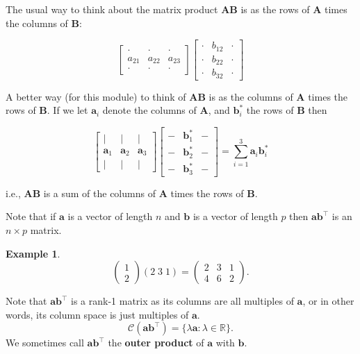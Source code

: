 \documentclass[]{book}
\theoremstyle{definition}
\theoremstyle{definition}
\newtheorem{example}{Example}[chapter]
\theoremstyle{definition}
\theoremstyle{remark}
\begin{document}
The usual way to think about the matrix product \(\boldsymbol A\boldsymbol B\) is as the rows of \(\boldsymbol A\) times the columns of \(\boldsymbol B\):

\[\left[ \begin{array}{ccc}
\cdot & \cdot &\cdot\\
a_{21}&a_{22}&a_{23}\\
\cdot & \cdot &\cdot
\end{array}
\right]\left[\begin{array}{ccc}
\cdot & b_{12} &\cdot\\
\cdot&b_{22}&\cdot\\
\cdot & b_{32} &\cdot
\end{array}
\right]\]

A better way (for this module) to think of \(\boldsymbol A\boldsymbol B\) is as the columns of \(\boldsymbol A\) times the rows of \(\boldsymbol B\). If we let \(\boldsymbol a_i\) denote the columns of \(\boldsymbol A\), and \(\boldsymbol b^*_i\) the rows of \(\boldsymbol B\) then

\[\left[ \begin{array}{ccc}
| & | &|\\
\boldsymbol a_{1}&\boldsymbol a_{2}&\boldsymbol a_{3}\\
| & | &|
\end{array}
\right]\left[\begin{array}{ccc}
- & \boldsymbol b_{1}^* &-\\
-&\boldsymbol b_{2}^*&-\\
- & \boldsymbol b_{3}^* &-
\end{array}
\right]=\sum_{i=1}^3\boldsymbol a_i \boldsymbol b_i^*\]

i.e., \(\boldsymbol A\boldsymbol B\) is a sum of the columns of \(\boldsymbol A\) times the rows of \(\boldsymbol B\).

Note that if \(\boldsymbol a\) is a vector of length \(n\) and \(\boldsymbol b\) is a vector of length \(p\) then
\(\boldsymbol a\boldsymbol b^\top\) is an \(n\times p\) matrix.

\begin{example}
\protect\hypertarget{exm:unnamed-chunk-1}{}{\label{exm:unnamed-chunk-1} }
\[\left( 
  \begin{array}{c}
1\\
2\end{array}
\right)
\left(2 \; 3\; 1\right)=
  \left(\begin{array}{ccc}
                                      2&3&1\\
                                      4&6&2
                                      \end{array}
                                      \right).
  \]
\end{example}
Note that \(\boldsymbol a\boldsymbol b^\top\) is a rank-1 matrix as its columns are all multiples of \(\boldsymbol a\), or in other words, its column space is just multiples of \(\boldsymbol a\).
\[\mathcal{C}(\boldsymbol a\boldsymbol b^\top) = \{\lambda \boldsymbol a: \lambda \in \mathbb{R}\}.\]
We sometimes call \(\boldsymbol a\boldsymbol b^\top\) the \textbf{outer product} of \(\boldsymbol a\) with \(\boldsymbol b\).
\end{document}
